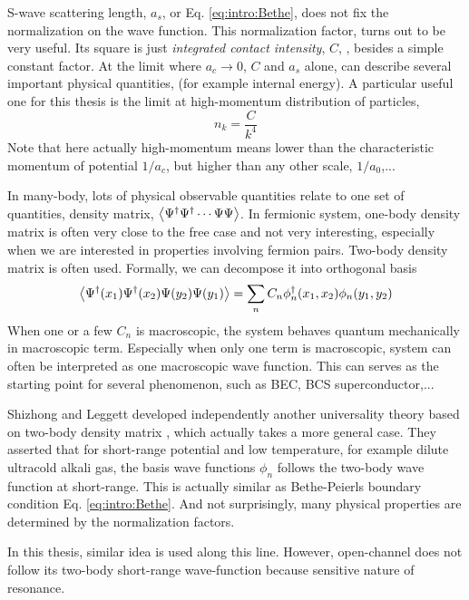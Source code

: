  S-wave scattering length, $a_s$, or Eq. \ref{eq:intro:Bethe}, does not fix the normalization on the wave function. This normalization factor, turns out to be very useful.  Its square is just \emph{integrated contact intensity}, $C$, \cite{ Tan2008-1,Tan2008-2,CombescotTan}, besides a simple constant factor.  At the limit where $a_c\to0$, $C$ and $a_s$ alone, can describe several important physical quantities, (for example internal energy).  A particular useful one for this thesis is the limit at high-momentum distribution of particles, 
 \begin{equation}
 n_k=\frac{C}{k^4}
 \end{equation}
 Note that here actually high-momentum means lower than the characteristic momentum of potential $1/a_c$, but higher than any other scale, $1/a_0$,...
 
 In many-body, lots of physical observable quantities relate to one set of  quantities, density matrix, $\bigl<{\Psi^{\dagger}\Psi^{\dagger}\cdots\Psi\Psi}\bigr>$. In fermionic system,  one-body density matrix is often very close to the free case and not very interesting, especially when we are interested in properties involving fermion pairs.  Two-body density matrix is often used. Formally, we can decompose it into orthogonal basis
 \begin{equation}
 \bigl<{\Psi^{\dagger}(x_1)\Psi^{\dagger}(x_2)\Psi(y_2)\Psi(y_1)}\bigr>=\sum_nC_n\phi_n^{\dagger}(x_1,x_2)\phi_n(y_1,y_2)
 \end{equation}     
 When one or a few $C_n$ is macroscopic, the system behaves quantum mechanically in macroscopic term.  Especially when only one term is macroscopic, system can often be interpreted as one macroscopic wave function.\cite{Leggett}  This can serves as the starting point for several phenomenon, such as BEC, BCS superconductor,...
 
Shizhong and Leggett developed independently another universality theory based on two-body density matrix \linebreak[2] \cite{shizhongUniv}, which actually takes a more general case.   They asserted that for short-range potential and low temperature, for example dilute ultracold alkali gas, the basis wave functions $\phi_n$ follows the two-body wave function at short-range. This is actually similar as Bethe-Peierls boundary condition Eq. \ref{eq:intro:Bethe}.  And not surprisingly, many physical properties are determined by the normalization factors.  

In this thesis, similar idea is used along this line.  However, open-channel does not follow its two-body short-range wave-function because sensitive nature of resonance. 
 
